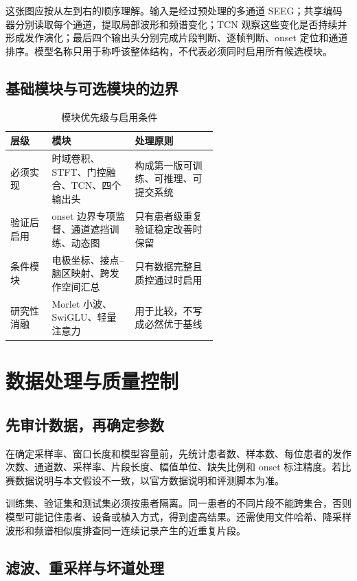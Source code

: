 \documentclass{cumcmthesis_v3}
\numberwithin{figure}{section}
\numberwithin{table}{section}
\begin{document}
这张图应按从左到右的顺序理解。输入是经过预处理的多通道 SEEG；共享编码器分别读取每个通道，提取局部波形和频谱变化；TCN 观察这些变化是否持续并形成发作演化；最后四个输出头分别完成片段判断、逐帧判断、onset 定位和通道排序。模型名称只用于称呼该整体结构，不代表必须同时启用所有候选模块。

\subsection{基础模块与可选模块的边界}

\begin{table}[htbp]
\centering
{}
\caption{模块优先级与启用条件}
\label{tab:module-priority}
\renewcommand{\arraystretch}{1.35}
\begin{tabularx}{\linewidth}{@{}p{0.20\linewidth}p{0.40\linewidth}X@{}}
\toprule
\textbf{层级} & \textbf{模块} & \textbf{处理原则} \\
\midrule
必须实现 & 时域卷积、STFT、门控融合、TCN、四个输出头 & 构成第一版可训练、可推理、可提交系统 \\
验证后启用 & onset 边界专项监督、通道遮挡训练、动态图 & 只有患者级重复验证稳定改善时保留 \\
条件模块 & 电极坐标、接点--脑区映射、跨发作空间汇总 & 只有数据完整且质控通过时启用 \\
研究性消融 & Morlet 小波、SwiGLU、轻量注意力 & 用于比较，不写成必然优于基线 \\
\bottomrule
\end{tabularx}
\end{table}

\section{数据处理与质量控制}

\subsection{先审计数据，再确定参数}

在确定采样率、窗口长度和模型容量前，先统计患者数、样本数、每位患者的发作次数、通道数、采样率、片段长度、幅值单位、缺失比例和 onset 标注精度。若比赛数据说明与本文假设不一致，以官方数据说明和评测脚本为准。

训练集、验证集和测试集必须按患者隔离。同一患者的不同片段不能跨集合，否则模型可能记住患者、设备或植入方式，得到虚高结果。还需使用文件哈希、降采样波形和频谱相似度排查同一连续记录产生的近重复片段。

\subsection{滤波、重采样与坏道处理}
\end{document}

